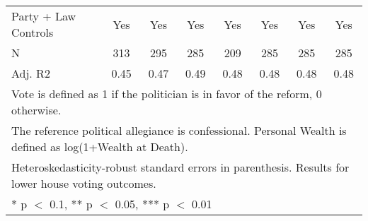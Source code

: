 \begin{table}
\begin{tabular}[t]{lccccccc}
\midrule
Party + Law Controls & Yes & Yes & Yes & Yes & Yes & Yes & Yes\\
N & \num{313} & \num{295} & \num{285} & \num{209} & \num{285} & \num{285} & \num{285}\\
Adj. R2 & \num{0.45} & \num{0.47} & \num{0.49} & \num{0.48} & \num{0.48} & \num{0.48} & \num{0.48}\\
\bottomrule
\multicolumn{8}{l}{\rule{0pt}{1em}Vote is defined as 1 if the politician is in favor of the reform, 0 otherwise.}\\
\multicolumn{8}{l}{\rule{0pt}{1em}The reference political allegiance is confessional. Personal Wealth is defined as log(1+Wealth at Death).}\\
\multicolumn{8}{l}{\rule{0pt}{1em}Heteroskedasticity-robust standard errors in parenthesis. Results for lower house voting outcomes.}\\
\multicolumn{8}{l}{\rule{0pt}{1em}* p $<$ 0.1, ** p $<$ 0.05, *** p $<$ 0.01}\\
\end{tabular}
\end{table}
